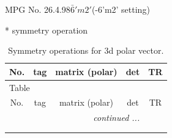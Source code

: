 \documentclass[fleqn,8pt]{jsarticle}
\begin{document}
\setcounter{MaxMatrixCols}{32}

\renewcommand{\tablename}{Table~}
\renewcommand{\figurename}{Figure~}
\begin{center}
\LARGE
MPG No. 26.4.98\quad$\bar{6}'m2'$\quad(-6'm2' setting)
\end{center}
* symmetry operation
\renewcommand{\arraystretch}{1.3}
\begin{longtable}{ccccc}
\caption{Symmetry operations for 3d polar vector.}
 \\
 \hline \hline
No. & tag & matrix (polar) & det & TR \\ \hline \endfirsthead

\multicolumn{4}{l}{\tablename\ \thetable{}} \\
 \hline \hline
No. & tag & matrix (polar) & det & TR \\ \hline \endhead

 \hline \hline
\multicolumn{4}{r}{\footnotesize\it continued ...} \\ \endfoot

 \hline \hline
\multicolumn{4}{r}{} \\ \endlastfoot


\end{longtable}
\end{document}
